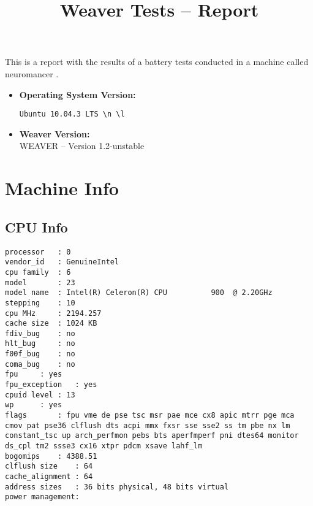 \documentclass{article}
\title{Weaver Tests -- Report}
\begin{document}
\maketitle
This is a report with the results of a battery
tests conducted in a machine called 
neuromancer
.
\begin{itemize}
\item
\textbf{Operating System Version: }
\begin{verbatim}
Ubuntu 10.04.3 LTS \n \l

\end{verbatim}
\item
\textbf{Weaver Version: }\\
WEAVER -- Version 1.2-unstable
\end{itemize}
\section{Machine Info}
\subsection{CPU Info}
\begin{verbatim}
processor	: 0
vendor_id	: GenuineIntel
cpu family	: 6
model		: 23
model name	: Intel(R) Celeron(R) CPU          900  @ 2.20GHz
stepping	: 10
cpu MHz		: 2194.257
cache size	: 1024 KB
fdiv_bug	: no
hlt_bug		: no
f00f_bug	: no
coma_bug	: no
fpu		: yes
fpu_exception	: yes
cpuid level	: 13
wp		: yes
flags		: fpu vme de pse tsc msr pae mce cx8 apic mtrr pge mca cmov pat pse36 clflush dts acpi mmx fxsr sse sse2 ss tm pbe nx lm constant_tsc up arch_perfmon pebs bts aperfmperf pni dtes64 monitor ds_cpl tm2 ssse3 cx16 xtpr pdcm xsave lahf_lm
bogomips	: 4388.51
clflush size	: 64
cache_alignment	: 64
address sizes	: 36 bits physical, 48 bits virtual
power management:

\end{verbatim}
\end{document}
